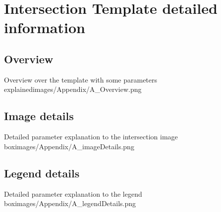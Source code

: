 \section{Intersection Template detailed information}\label{AppendixA}
\subsection{Overview}

\begin{figureGiGa}{Overview over the template with some parameters explained}{images/Appendix/A_Overview.png}
\end{figureGiGa}

\subsection{Image details}

\begin{figureGiGa}{Detailed parameter explanation to the intersection image box}{images/Appendix/A_imageDetails.png}
\end{figureGiGa}

\subsection{Legend details}

\begin{figureGiGa}{Detailed parameter explanation to the legend box}{images/Appendix/A_legendDetails.png}
\end{figureGiGa}
